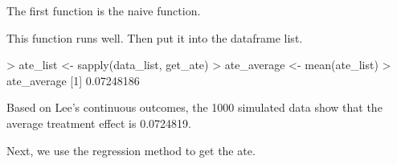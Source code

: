 \documentclass[
]{article}
\newenvironment{Shaded}{\begin{snugshade}}{\end{snugshade}}
\newcommand{\CommentTok}[1]{\textcolor[rgb]{0.56,0.35,0.01}{\textit{#1}}}
\newcommand{\ControlFlowTok}[1]{\textcolor[rgb]{0.13,0.29,0.53}{\textbf{#1}}}
\newcommand{\DecValTok}[1]{\textcolor[rgb]{0.00,0.00,0.81}{#1}}
\newcommand{\FloatTok}[1]{\textcolor[rgb]{0.00,0.00,0.81}{#1}}
\newcommand{\FunctionTok}[1]{\textcolor[rgb]{0.00,0.00,0.00}{#1}}
\newcommand{\NormalTok}[1]{#1}
\newcommand{\OtherTok}[1]{\textcolor[rgb]{0.56,0.35,0.01}{#1}}
\newcommand{\SpecialCharTok}[1]{\textcolor[rgb]{0.00,0.00,0.00}{#1}}
\begin{document}
The first function is the naive function.

\begin{Shaded}
\end{Shaded}

This function runs well. Then put it into the dataframe list.

\begin{Shaded}
\begin{Highlighting}[]
\SpecialCharTok{\textgreater{}}\NormalTok{ ate\_list }\OtherTok{\textless{}{-}} \FunctionTok{sapply}\NormalTok{(data\_list, get\_ate)}
\SpecialCharTok{\textgreater{}}\NormalTok{ ate\_average }\OtherTok{\textless{}{-}} \FunctionTok{mean}\NormalTok{(ate\_list)}
\SpecialCharTok{\textgreater{}}\NormalTok{ ate\_average}
\NormalTok{[}\DecValTok{1}\NormalTok{] }\FloatTok{0.07248186}
\end{Highlighting}
\end{Shaded}

Based on Lee's continuous outcomes, the 1000 simulated data show that
the average treatment effect is 0.0724819.

Next, we use the regression method to get the ate.
\end{document}
